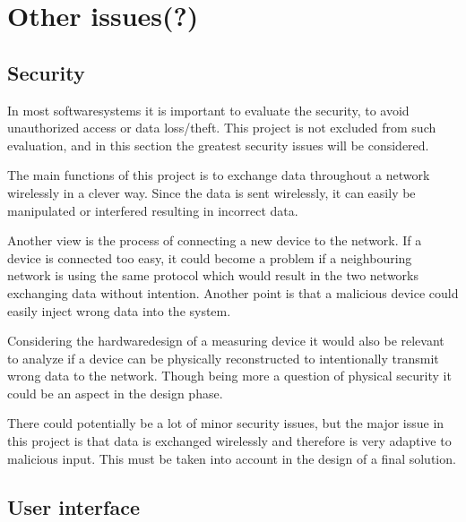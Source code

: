 \section{Other issues(?)}

\subsection{Security}
In most softwaresystems it is important to evaluate the security, to avoid unauthorized access or data loss/theft. This project is not excluded from such evaluation, and in this section the greatest security issues will be considered.

The main functions of this project is to exchange data throughout a network wirelessly in a clever way. Since the data is sent wirelessly, it can easily be manipulated or interfered resulting in incorrect data.

Another view is the process of connecting a new device to the network. If a device is connected too easy, it could become a problem if a neighbouring network is using the same protocol which would result in the two networks exchanging data without intention. Another point is that a malicious device could easily inject wrong data into the system.

Considering the hardwaredesign of a measuring device it would also be relevant to analyze if a device can be physically reconstructed to intentionally transmit wrong data to the network. Though being more a question of physical security it could be an aspect in the design phase.

There could potentially be a lot of minor security issues, but the major issue in this project is that data is exchanged wirelessly and therefore is very adaptive to malicious input. This must be taken into account in the design of a final solution.

\subsection{User interface}